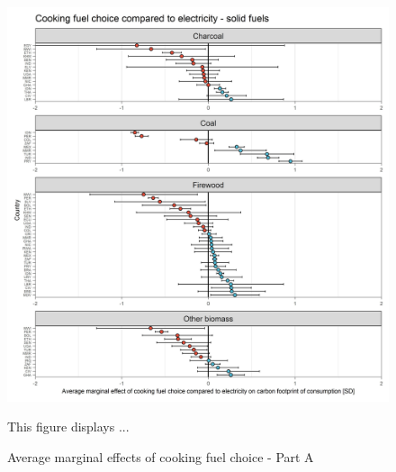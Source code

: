 \documentclass[12pt, a4paper]{article}
\newenvironment{subcaption}
{\strut
\vspace{-5pt}
\begin{minipage}[b]{0.9\textwidth}
  \hspace*{-\parindent}
  \footnotesize}
 {\end{minipage}}
\begin{document}
\begin{figure}[ht!]
  \centering
 \caption{Average marginal effects of cooking fuel choice - Part A} \label{fig:D6_Electricity_A}
  \includegraphics{Analysis_OLS_ME_Carbon_Footprint/AME_OLS_FP_CF_Electricity A}
  \begin{subcaption}
    This figure displays ...
  \end{subcaption}

\end{figure}

\clearpage
\end{document}
